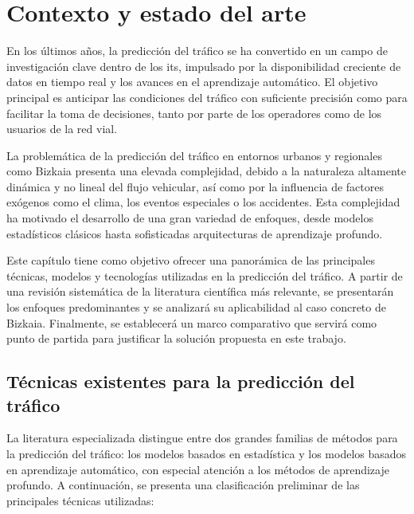 \section{Contexto y estado del arte}

En los últimos años, la predicción del tráfico se ha convertido en un campo de investigación clave dentro de los \acrlong{its}, impulsado por la disponibilidad creciente de datos en tiempo real y los avances en el aprendizaje automático. El objetivo principal es anticipar las condiciones del tráfico con suficiente precisión como para facilitar la toma de decisiones, tanto por parte de los operadores como de los usuarios de la red vial.

La problemática de la predicción del tráfico en entornos urbanos y regionales como Bizkaia presenta una elevada complejidad, debido a la naturaleza altamente dinámica y no lineal del flujo vehicular, así como por la influencia de factores exógenos como el clima, los eventos especiales o los accidentes. Esta complejidad ha motivado el desarrollo de una gran variedad de enfoques, desde modelos estadísticos clásicos hasta sofisticadas arquitecturas de aprendizaje profundo.

Este capítulo tiene como objetivo ofrecer una panorámica de las principales técnicas, modelos y tecnologías utilizadas en la predicción del tráfico. A partir de una revisión sistemática de la literatura científica más relevante, se presentarán los enfoques predominantes y se analizará su aplicabilidad al caso concreto de Bizkaia. Finalmente, se establecerá un marco comparativo que servirá como punto de partida para justificar la solución propuesta en este trabajo.

\subsection{Técnicas existentes para la predicción del tráfico}

La literatura especializada distingue entre dos grandes familias de métodos para la predicción del tráfico: los modelos basados en estadística y los modelos basados en aprendizaje automático, con especial atención a los métodos de aprendizaje profundo. A continuación, se presenta una clasificación preliminar de las principales técnicas utilizadas:

